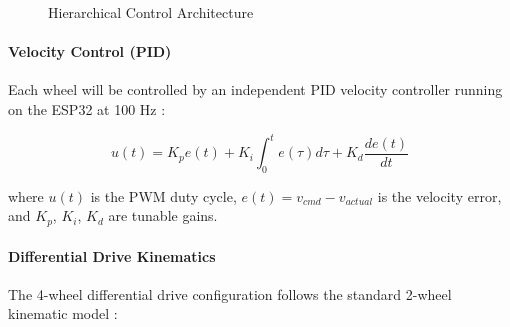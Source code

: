 \begin{figure}[H]
\centering
{}
\caption{Hierarchical Control Architecture}
\label{fig:control-hierarchy}
\end{figure}

\paragraph{Velocity Control (PID)}

Each wheel will be controlled by an independent PID velocity controller running on the ESP32 at 100 Hz \parencite{astrom_pid}:

\begin{equation}
u(t) = K_p e(t) + K_i \int_0^t e(\tau) d\tau + K_d \frac{de(t)}{dt}
\end{equation}

where $u(t)$ is the PWM duty cycle, $e(t) = v_{cmd} - v_{actual}$ is the velocity error, and $K_p$, $K_i$, $K_d$ are tunable gains.

\paragraph{Differential Drive Kinematics}

The 4-wheel differential drive configuration follows the standard 2-wheel kinematic model \parencite{siciliano_robotics}:

